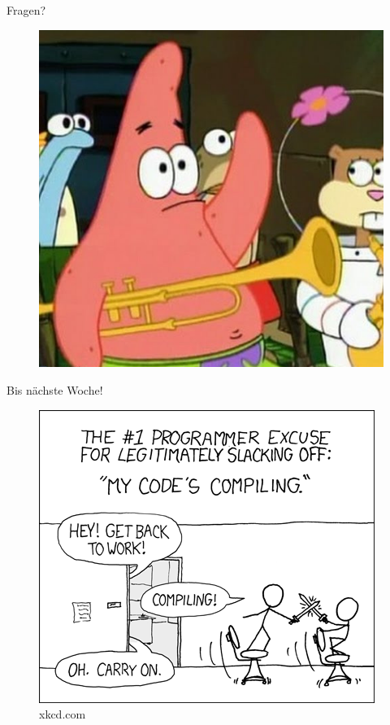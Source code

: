 \documentclass[18pt]{beamer}
\begin{document}
\appendix

\beginbackup

\begin{frame}{Fragen?}
    \begin{figure}
        \includegraphics[scale=.3]{img/fragen.jpg}
    \end{figure}
\end{frame}

\begin{frame}{Bis nächste Woche!}
    \begin{figure}
        \includegraphics[scale=.4]{img/compiling.png}
        \caption{\footnotesize{xkcd.com}}
    \end{figure}
\end{frame}

\backupend
\end{document}
